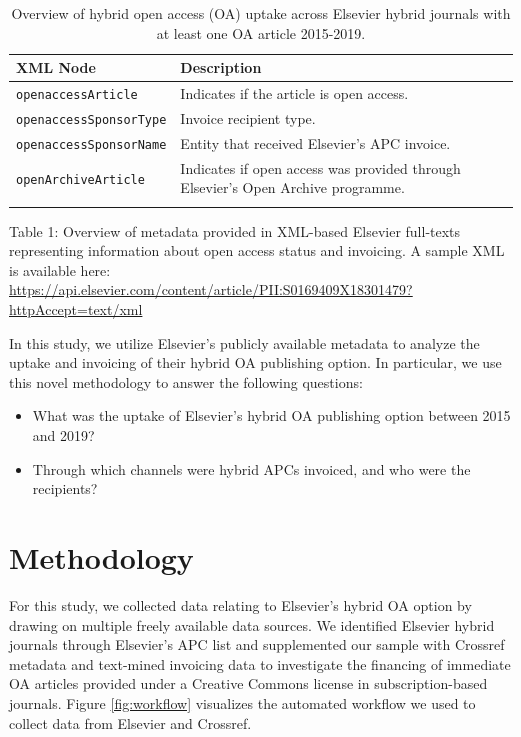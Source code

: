 \documentclass[a4paper,man,floatsintext,longtable,noextraspace,12pt]{apa6}
\begin{document}
\begin{table}[H]
\caption{\label{tab:els_xml}Overview of hybrid open access (OA) uptake across Elsevier hybrid journals with at least one OA article 2015-2019.}
\centering
\begin{tabular}[t]{lp{10cm}}
\toprule
XML Node & Description\\
\midrule
\texttt{openaccessArticle} & Indicates if the article is open
access. \\
\texttt{openaccessSponsorType} & Invoice recipient type.\\
\texttt{openaccessSponsorName} & Entity that received Elsevier's APC
invoice.\\
\texttt{openArchiveArticle} & Indicates if open access was provided through
Elsevier's Open Archive programme.\tabularnewline \\
\bottomrule
\end{tabular}
\end{table}

Table 1: Overview of metadata provided in XML-based Elsevier full-texts
representing information about open access status and invoicing. A
sample XML is available here:
\url{https://api.elsevier.com/content/article/PII:S0169409X18301479?httpAccept=text/xml}

In this study, we utilize Elsevier's publicly available metadata to
analyze the uptake and invoicing of their hybrid OA publishing option.
In particular, we use this novel methodology to answer the following
questions:

\begin{itemize}
\item
  What was the uptake of Elsevier's hybrid OA publishing option between
  2015 and 2019?
\item
  Through which channels were hybrid APCs invoiced, and who were the
  recipients?
\end{itemize}

\hypertarget{methodology}{%
\section{Methodology}\label{methodology}}

For this study, we collected data relating to Elsevier's hybrid OA
option by drawing on multiple freely available data sources. We
identified Elsevier hybrid journals through Elsevier's APC list and
supplemented our sample with Crossref metadata and text-mined invoicing
data to investigate the financing of immediate OA articles provided
under a Creative Commons license in subscription-based journals. Figure
\ref{fig:workflow} visualizes the automated workflow we used to collect
data from Elsevier and Crossref.
\end{document}
